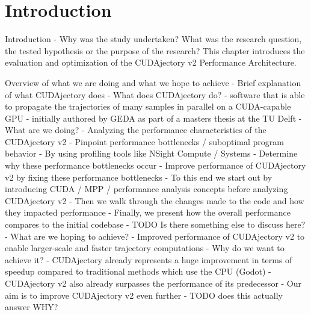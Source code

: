 \chapter{Introduction}
Introduction - Why was the study undertaken? What was the research question, the tested hypothesis or the purpose of the research?
This chapter introduces the evaluation and optimization of the CUDAjectory v2 Performance Architecture.


Overview of what we are doing and what we hope to achieve
- Brief explanation of what CUDAjectory does
	- What does CUDAjectory do?
		- software that is able to propagate the trajectories of many samples in parallel on a CUDA-capable GPU \cite{geda_massive_2019}
	- initially authored by GEDA as part of a masters thesis at the TU Delft
- What are we doing?
	- Analyzing the performance characteristics of the CUDAjectory v2
		- Pinpoint performance bottlenecks / suboptimal program behavior
			- By using profiling tools like NSight Compute / Systems
		- Determine why these performance bottlenecks occur
	- Improve performance of CUDAjectory v2 by fixing these performance bottlenecks
	- To this end we start out by introducing CUDA / MPP / performance analysis concepts before analyzing CUDAjectory v2
	- Then we walk through the changes made to the code and how they impacted performance
	- Finally, we present how the overall performance compares to the initial codebase
	- TODO Is there something else to discuss here?
- What are we hoping to achieve?
	- Improved performance of CUDAjectory v2 to enable larger-scale and faster trajectory computations
- Why do we want to achieve it?
	- CUDAjectory already represents a huge improvement in terms of speedup compared to traditional methods which use the CPU (Godot)
	- CUDAjectory v2 also already surpasses the performance of its predecessor
	- Our aim is to improve CUDAjectory v2 even further
	- TODO does this actually answer WHY?

